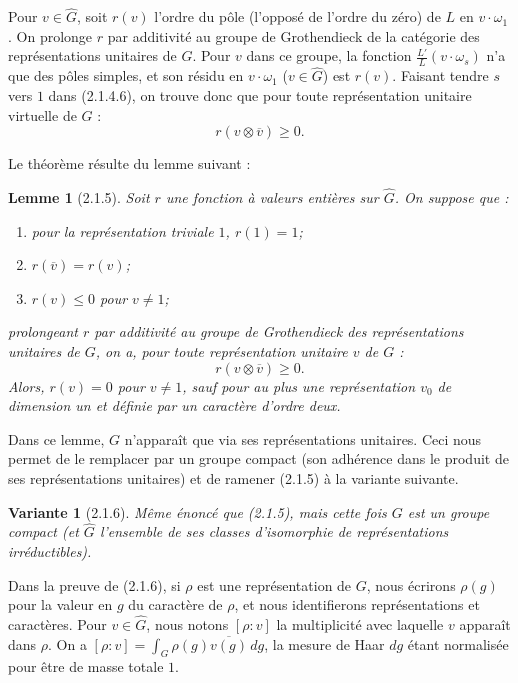 \documentclass[12pt,a4paper]{article}
\theoremstyle{plain}
\newtheorem{lemma}[theorem]{Lemme}
\newtheorem{variante}[theorem]{Variante}
\theoremstyle{definition}
\theoremstyle{remark}
\begin{document}
Pour $v \in \widehat{G}$, soit $r(v)$ l'ordre du p\^ole (l'oppos\'e de l'ordre du z\'ero) de $L$ en $v \cdot \omega_1$. On prolonge $r$ par additivit\'e au groupe de Grothendieck de la cat\'egorie des repr\'esentations unitaires de $G$. Pour $v$ dans ce groupe, la fonction $\frac{L'}{L}(v \cdot \omega_s)$ n'a que des p\^oles simples, et son r\'esidu en $v \cdot \omega_1$ ($v \in \widehat{G}$) est $r(v)$. Faisant tendre $s$ vers $1$ dans (2.1.4.6), on trouve donc que pour toute repr\'esentation unitaire virtuelle de $G$ :
\[ r(v \otimes \overline{v}) \geq 0. \]

Le th\'eor\`eme r\'esulte du lemme suivant :

\begin{lemma}[2.1.5]
Soit $r$ une fonction \`a valeurs enti\`eres sur $\widehat{G}$. On suppose que :
\begin{enumerate}[label=\alph*)]
\item pour la repr\'esentation triviale $1$, $r(1) = 1$;
\item $r(\overline{v}) = r(v)$;
\item $r(v) \leq 0$ pour $v \neq 1$;
\end{enumerate}
prolongeant $r$ par additivit\'e au groupe de Grothendieck des repr\'esentations unitaires de $G$, on a, pour toute repr\'esentation unitaire $v$ de $G$ :
\[ r(v \otimes \overline{v}) \geq 0. \]
Alors, $r(v) = 0$ pour $v \neq 1$, sauf pour au plus une repr\'esentation $v_0$ de dimension un et d\'efinie par un caract\`ere d'ordre deux.
\end{lemma}

Dans ce lemme, $G$ n'appara\^it que via ses repr\'esentations unitaires. Ceci nous permet de le remplacer par un groupe compact (son adh\'erence dans le produit de ses repr\'esentations unitaires) et de ramener (2.1.5) \`a la variante suivante.

\begin{variante}[2.1.6]
M\^eme \'enonc\'e que (2.1.5), mais cette fois $G$ est un groupe compact (et $\widehat{G}$ l'ensemble de ses classes d'isomorphie de repr\'esentations irr\'eductibles).
\end{variante}

Dans la preuve de (2.1.6), si $\rho$ est une repr\'esentation de $G$, nous \'ecrirons $\rho(g)$ pour la valeur en $g$ du caract\`ere de $\rho$, et nous identifierons repr\'esentations et caract\`eres. Pour $v \in \widehat{G}$, nous notons $[\rho : v]$ la multiplicit\'e avec laquelle $v$ appara\^it dans $\rho$. On a $[\rho : v] = \int_G \rho(g) \overline{v(g)}\, dg$, la mesure de Haar $dg$ \'etant normalis\'ee pour \^etre de masse totale $1$.
\end{document}
